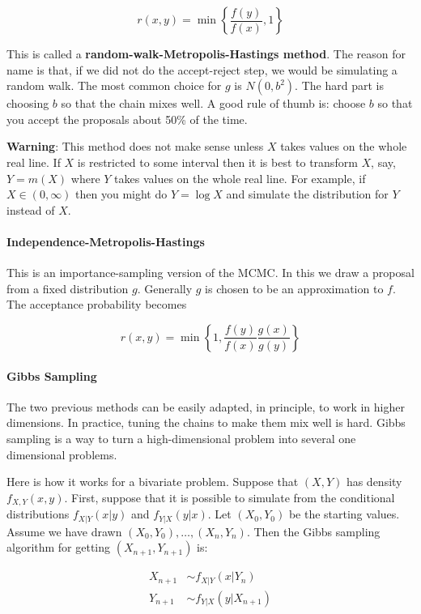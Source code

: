 \[ r(x, y) = \min \left\{ \frac{f(y)}{f(x)}, 1 \right\} \]

This is called a \textbf{random-walk-Metropolis-Hastings method}. The
reason for name is that, if we did not do the accept-reject step, we
would be simulating a random walk. The most common choice for \(g\) is
\(N(0, b^{2})\). The hard part is choosing \(b\) so that the chain mixes
well. A good rule of thumb is: choose \(b\) so that you accept the
proposals about 50\% of the time.

\textbf{Warning}: This method does not make sense unless \(X\) takes
values on the whole real line. If \(X\) is restricted to some interval
then it is best to transform \(X\), say, \(Y = m(X)\) where \(Y\) takes
values on the whole real line. For example, if \(X \in (0, \infty)\)
then you might do \(Y = \log X\) and simulate the distribution for \(Y\)
instead of \(X\).

\paragraph{Independence-Metropolis-Hastings}\label{independence-metropolis-hastings}

This is an importance-sampling version of the MCMC. In this we draw a
proposal from a fixed distribution \(g\). Generally \(g\) is chosen to
be an approximation to \(f\). The acceptance probability becomes

\[ r(x, y) = \min \left\{ 1, \frac{f(y)}{f(x)} \frac{g(x)}{g(y)} \right\} \]

\paragraph{Gibbs Sampling}\label{gibbs-sampling}

The two previous methods can be easily adapted, in principle, to work in
higher dimensions. In practice, tuning the chains to make them mix well
is hard. Gibbs sampling is a way to turn a high-dimensional problem into
several one dimensional problems.

Here is how it works for a bivariate problem. Suppose that \((X, Y)\) has
density \(f_{X, Y}(x, y)\). First, suppose that it is possible to
simulate from the conditional distributions \(f_{X|Y}(x | y)\) and
\(f_{Y | X}(y | x)\). Let \((X_{0}, Y_{0})\) be the starting values. Assume
we have drawn \((X_{0}, Y_{0}), \dots, (X_{n}, Y_{n})\). Then the Gibbs sampling
algorithm for getting \((X_{n+1}, Y_{n+1})\) is:

\begin{align*}
X_{n + 1} &\sim f_{X|Y}(x | Y_{n}) \\
Y_{n + 1} &\sim f_{Y|X}(y | X_{n + 1})
\end{align*}

